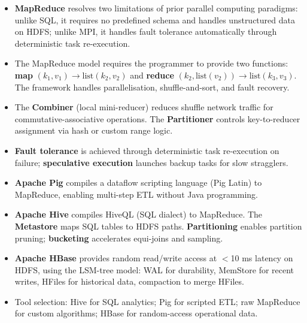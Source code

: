 \begin{itemize}
  \item \textbf{MapReduce} resolves two limitations of prior parallel
        computing paradigms: unlike SQL, it requires no predefined
        schema and handles unstructured data on HDFS; unlike MPI, it
        handles fault tolerance automatically through deterministic
        task re-execution.

  \item The MapReduce model requires the programmer to provide two
        functions: \textbf{map} $(k_1, v_1) \to \text{list}(k_2, v_2)$
        and \textbf{reduce} $(k_2, \text{list}(v_2)) \to \text{list}(k_3, v_3)$.
        The framework handles parallelisation, shuffle-and-sort, and
        fault recovery.

  \item The \textbf{Combiner} (local mini-reducer) reduces shuffle
        network traffic for commutative-associative operations. The
        \textbf{Partitioner} controls key-to-reducer assignment via
        hash or custom range logic.

  \item \textbf{Fault tolerance} is achieved through deterministic task
        re-execution on failure; \textbf{speculative execution} launches
        backup tasks for slow stragglers.

  \item \textbf{Apache Pig} compiles a dataflow scripting language
        (Pig Latin) to MapReduce, enabling multi-step ETL without
        Java programming.

  \item \textbf{Apache Hive} compiles HiveQL (SQL dialect) to
        MapReduce. The \textbf{Metastore} maps SQL tables to HDFS paths.
        \textbf{Partitioning} enables partition pruning; \textbf{bucketing}
        accelerates equi-joins and sampling.

  \item \textbf{Apache HBase} provides random read/write access at
        $<$10 ms latency on HDFS, using the LSM-tree model: WAL for
        durability, MemStore for recent writes, HFiles for historical
        data, compaction to merge HFiles.

  \item Tool selection: Hive for SQL analytics; Pig for scripted ETL;
        raw MapReduce for custom algorithms; HBase for random-access
        operational data.
\end{itemize}


